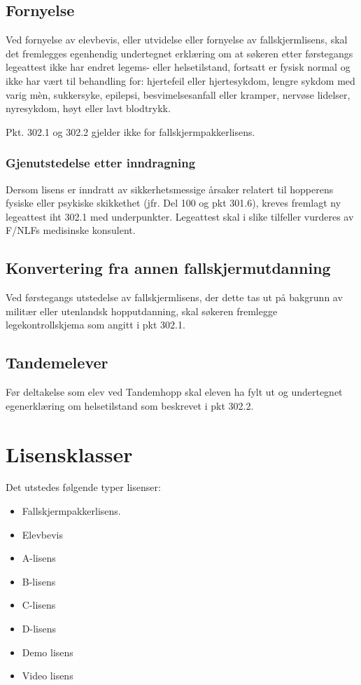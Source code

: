 \subsection{Fornyelse}
Ved fornyelse av elevbevis, eller utvidelse eller fornyelse av fallskjermlisens, skal det fremlegges egenhendig undertegnet erklæring om at søkeren etter førstegangs legeattest ikke har endret legems- eller helsetilstand, fortsatt er fysisk normal og ikke har vært til behandling for: hjertefeil eller hjertesykdom, lengre sykdom med varig mèn, sukkersyke, epilepsi, besvimelsesanfall eller kramper, nervøse lidelser, nyresykdom, høyt eller lavt blodtrykk.

Pkt. 302.1 og 302.2 gjelder ikke for fallskjermpakkerlisens.

\subsubsection{Gjenutstedelse etter inndragning}
Dersom lisens er inndratt av sikkerhetsmessige årsaker relatert til hopperens fysiske eller psykiske skikkethet (jfr. Del 100 og pkt 301.6), kreves fremlagt ny legeattest iht 302.1 med underpunkter. Legeattest skal i slike tilfeller vurderes av F/NLFs medisinske konsulent.

\subsection{Konvertering fra annen fallskjermutdanning}
Ved førstegangs utstedelse av fallskjermlisens, der dette tas ut på bakgrunn av militær eller utenlandsk hopputdanning, skal søkeren fremlegge legekontrollskjema som angitt i pkt 302.1.

\subsection{Tandemelever}
Før deltakelse som elev ved Tandemhopp skal eleven ha fylt ut og undertegnet egenerklæring om helsetilstand som beskrevet i pkt 302.2.

\section{Lisensklasser}
Det utstedes følgende typer lisenser:
\begin{itemize}
	\item Fallskjermpakkerlisens.
	\item Elevbevis
	\item A-lisens
	\item B-lisens
	\item C-lisens
	\item D-lisens
	\item Demo lisens
	\item Video lisens
\end{itemize}

